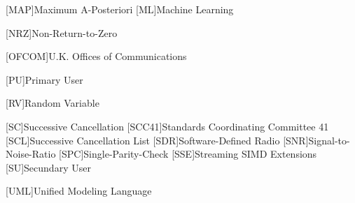 \begin{acronym}[TROLL]
  [MAP]{Maximum A-Posteriori}
  [ML]{Machine Learning}

  [NRZ]{Non-Return-to-Zero}

  [OFCOM]{U.K. Offices of Communications}

  [PU]{Primary User}

  [RV]{Random Variable}

  [SC]{Successive Cancellation}
  [SCC41]{Standards Coordinating Committee 41}
  [SCL]{Successive Cancellation List}
  [SDR]{Software-Defined Radio}
  [SNR]{Signal-to-Noise-Ratio}
  [SPC]{Single-Parity-Check}
  [SSE]{Streaming SIMD Extensions}
  [SU]{Secundary User}

 [UML]{Unified Modeling Language}
\end{acronym}
